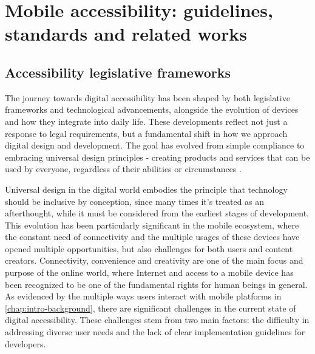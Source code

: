 \chapter{Mobile accessibility: guidelines, standards and related works}
\label{chap:accessibility}


\section{Accessibility legislative frameworks}
\label{chap:accessibility-history-rules}

The journey towards digital accessibility has been shaped by both legislative frameworks and technological advancements, alongside the evolution of devices and how they integrate into daily life. These developments reflect not just a response to legal requirements, but a fundamental shift in how we approach digital design and development. The goal has evolved from simple compliance to embracing universal design principles - creating products and services that can be used by everyone, regardless of their abilities or circumstances \cite{article:universal-design}.

Universal design in the digital world embodies the principle that technology should be inclusive by conception, since many times it's treated as an afterthought, while it must be considered from the earliest stages of development. This evolution has been particularly significant in the mobile ecosystem, where the constant need of connectivity and the multiple usages of these devices have opened multiple opportunities, but also challenges for both users and content creators. Connectivity, convenience and creativity are one of the main focus and purpose of the online world, where Internet and access to a mobile device has been recognized to be one of the fundamental rights for human beings in general. As evidenced by the multiple ways users interact with mobile platforms in \ref{chap:intro-background}, there are significant challenges in the current state of digital accessibility. These challenges stem from two main factors: the difficulty in addressing diverse user needs and the lack of clear implementation guidelines for developers. \\


